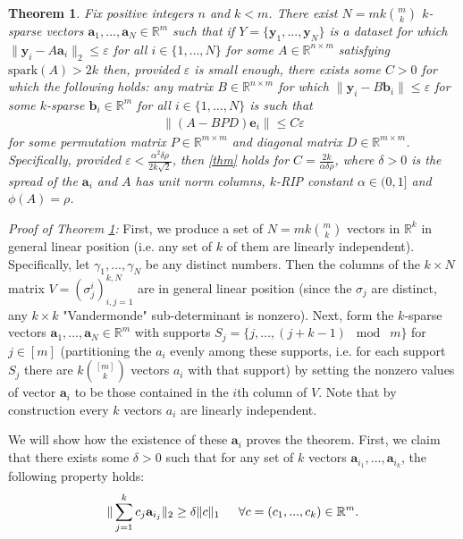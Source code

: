 \documentclass[journal,onecolumn]{IEEEtran}
\newtheorem{theorem}{Theorem}
\begin{document}

\begin{theorem}\label{RobustDUT}
Fix positive integers $n$ and $k < m$. There exist $N =  mk{m \choose k}$ $k$-sparse vectors $\mathbf{a}_1, \ldots, \mathbf{a}_N \in \mathbb{R}^m$ such that if $Y = \{\mathbf{y}_1, ..., \mathbf{y}_N \}$ is a dataset for which $\|\mathbf{y}_i - A\mathbf{a}_i\|_2 \leq \varepsilon$ for all $i \in \{1, \ldots, N\}$ for some $A \in \mathbb{R}^{n \times m}$ satisfying $\text{spark}(A) > 2k$ then, provided $\varepsilon$ is small enough, there exists some $C > 0$ for which the following holds: any matrix $B \in \mathbb{R}^{n \times m}$ for which $\|\mathbf{y}_i - B\mathbf{b}_i\| \leq \varepsilon$ for some $k$-sparse $\mathbf{b}_i \in \mathbb{R}^{m}$ for all $i \in \{1, \ldots, N\}$ is such that 
\begin{align}\label{thm}
\|(A - BPD)\mathbf{e}_i\| \leq C\varepsilon
\end{align}
%
for some permutation matrix $P \in \mathbb{R}^{m \times m}$ and diagonal matrix $D \in \mathbb{R}^{m \times m}$. Specifically, provided $\varepsilon < \frac{\alpha^2 \delta \rho}{2k\sqrt{2}}$, then \eqref{thm} holds for $C = \frac{2k}{\alpha\delta\rho}$, where $\delta > 0$ is the spread of the $\mathbf{a}_i$ and $A$ has unit norm columns, $k$-RIP constant $\alpha \in (0,1]$ and $\phi(A) = \rho$.
\end{theorem}

\emph{Proof of Theorem \ref{RobustDUT}:} First, we produce a set of $N = mk{m \choose k}$ vectors in $\mathbb{R}^k$ in general linear position (i.e. any set of $k$ of them are linearly independent). Specifically, let $\gamma_1, ..., \gamma_N$ be any distinct numbers. Then the columns of the $k \times N$ matrix $V = (\sigma^i_j)^{k,N}_{i,j=1}$ are in general linear position (since the $\sigma_j$ are distinct, any $k \times k$ "Vandermonde" sub-determinant is nonzero). Next, form the $k$-sparse vectors $\mathbf{a}_1, \ldots, \mathbf{a}_N \in \mathbb{R}^m$ with supports $S_j = \{j, \ldots, (j + k-1)\;\bmod\; m \}$ for $j \in [m]$ (partitioning the $a_i$ evenly among these supports, i.e. for each support $S_j$ there are $k{[m] \choose k}$ vectors $a_i$ with that support) by setting the nonzero values of vector $\mathbf{a}_i$ to be those contained in the $i$th column of $V$. Note that by construction every $k$ vectors $a_i$ are linearly independent. 

We will show how the existence of these $\mathbf{a}_i$ proves the theorem. First, we claim that there exists some $\delta > 0$ such that for any set of $k$ vectors $\mathbf{a}_{i_1}, ..., \mathbf{a}_{i_k}$, the following property holds:
\begin{align}\label{DataSpread}
\|\sum_{j = 1}^k c_j \mathbf{a}_{i_j}\|_2 \geq \delta \|c\|_1 \indent \forall c = (c_1, ..., c_k) \in \mathbb{R}^m.
\end{align}
\end{document}
